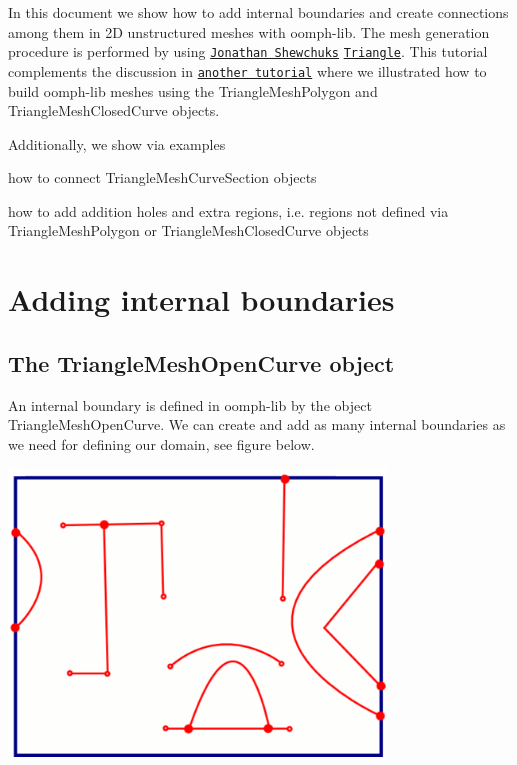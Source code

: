 In this document we show how to add internal boundaries and create connections among them in 2D unstructured meshes with {\ttfamily oomph-\/lib}. The mesh generation procedure is performed by using \href{http://www.cs.berkeley.edu/~jrs/}{\tt Jonathan Shewchuk\textquotesingle{}s} \href{http://www.cs.cmu.edu/~quake/triangle.html}{\tt Triangle}. This tutorial complements the discussion in \href{../../../../doc/meshes/mesh_from_inline_triangle/html/index.html}{\tt another tutorial} where we illustrated how to build {\ttfamily oomph-\/lib} meshes using the {\ttfamily Triangle\+Mesh\+Polygon} and {\ttfamily Triangle\+Mesh\+Closed\+Curve} objects.





Additionally, we show via examples
\begin{DoxyItemize}
\item how to connect {\ttfamily Triangle\+Mesh\+Curve\+Section} objects
\item how to add addition holes and extra regions, i.\+e. regions not defined via {\ttfamily Triangle\+Mesh\+Polygon} or {\ttfamily Triangle\+Mesh\+Closed\+Curve} objects
\end{DoxyItemize}



 

\hypertarget{index_overview}{}\section{Adding internal boundaries}\label{index_overview}
\hypertarget{index_open_curve}{}\subsection{The Triangle\+Mesh\+Open\+Curve object}\label{index_open_curve}
An internal boundary is defined in {\ttfamily oomph-\/lib} by the object {\ttfamily Triangle\+Mesh\+Open\+Curve}. We can create and add as many internal boundaries as we need for defining our domain, see figure below.

 
\begin{DoxyImage}
\includegraphics[width=0.75\textwidth]{figure_extravagant}
\end{DoxyImage}


